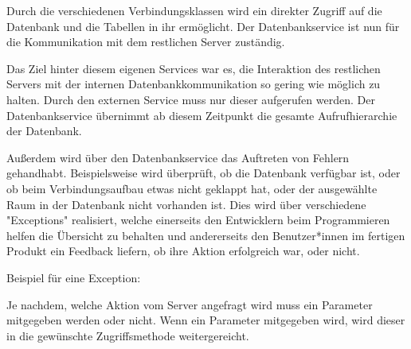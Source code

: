 
Durch die verschiedenen Verbindungsklassen wird ein direkter Zugriff auf die Datenbank und die Tabellen in ihr ermöglicht. Der Datenbankservice ist nun für die Kommunikation mit dem restlichen Server zuständig. 

Das Ziel hinter diesem eigenen Services war es, die Interaktion des restlichen Servers mit der internen Datenbankkommunikation so gering wie möglich zu halten. Durch den externen Service muss nur dieser aufgerufen werden. Der Datenbankservice übernimmt ab diesem Zeitpunkt die gesamte Aufrufhierarchie der Datenbank.

Außerdem wird über den Datenbankservice das Auftreten von Fehlern gehandhabt. Beispielsweise wird überprüft, ob die Datenbank verfügbar ist, oder ob beim Verbindungsaufbau etwas nicht geklappt hat, oder der ausgewählte Raum in der Datenbank nicht vorhanden ist. Dies wird über verschiedene "Exceptions" realisiert, welche einerseits den Entwicklern beim Programmieren helfen die Übersicht zu behalten und andererseits den Benutzer*innen im fertigen Produkt ein Feedback liefern, ob ihre Aktion erfolgreich war, oder nicht.

Beispiel für eine Exception:


Je nachdem, welche Aktion vom Server angefragt wird muss ein Parameter mitgegeben werden oder nicht. Wenn ein Parameter mitgegeben wird, wird dieser in die gewünschte Zugriffsmethode weitergereicht.

